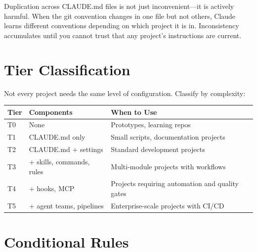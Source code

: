 \begin{whybox}
Duplication across CLAUDE.md files is not just inconvenient---it is
actively harmful. When the git convention changes in one file but not others,
Claude learns different conventions depending on which project it is in.
Inconsistency accumulates until you cannot trust that any project's
instructions are current.
\end{whybox}

\section{Tier Classification}
\label{sec:tiers}

Not every project needs the same level of configuration.
Classify by complexity:

\begin{fullwidth}
\begin{tabular}{@{}llp{8cm}@{}}
\toprule
\textbf{Tier} & \textbf{Components} & \textbf{When to Use} \\
\midrule
T0 & None & Prototypes, learning repos \\
T1 & CLAUDE.md only & Small scripts, documentation projects \\
T2 & CLAUDE.md + settings & Standard development projects \\
T3 & + skills, commands, rules & Multi-module projects with workflows \\
T4 & + hooks, MCP & Projects requiring automation and quality gates \\
T5 & + agent teams, pipelines & Enterprise-scale projects with CI/CD \\
\bottomrule
\end{tabular}
\end{fullwidth}


\section{Conditional Rules}
\label{sec:conditional-rules}


